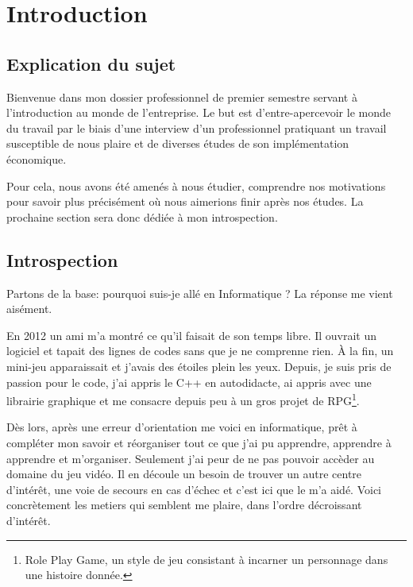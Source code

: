 \documentclass[12pt, a4paper]{report} %
\begin{document}
\maketitle


\chapter{Introduction}

\section*{Explication du sujet}
Bienvenue dans mon dossier professionnel de premier semestre servant à l'introduction au monde de l'entreprise. Le but est d'entre-apercevoir le monde du travail par le biais d'une interview d'un professionnel pratiquant un travail susceptible de nous plaire et de diverses études de son implémentation économique.

Pour cela, nous avons été amenés à nous étudier, comprendre nos motivations pour savoir plus précisément où nous aimerions finir après nos études. La prochaine section sera donc dédiée à mon introspection.

\section{Introspection}
Partons de la base: pourquoi suis-je allé en Informatique ? La réponse me vient aisément.

En 2012 un ami m'a montré ce qu'il faisait de son temps libre. Il ouvrait un logiciel et tapait des lignes de codes sans que je ne comprenne rien. \`A la fin, un mini-jeu apparaissait et j'avais des étoiles plein les yeux. Depuis, je suis pris de passion pour le code, j'ai appris le C++ en autodidacte, ai appris avec une librairie graphique et me consacre depuis peu à un gros projet de RPG\footnote{Role Play Game, un style de jeu consistant à incarner un personnage dans une histoire donnée.}.

Dès lors, après une erreur d'orientation me voici en informatique, prêt à compléter mon savoir et réorganiser tout ce que j'ai pu apprendre, apprendre à apprendre et m'organiser. Seulement j'ai peur de ne pas pouvoir accèder au domaine du jeu vidéo. Il en découle un besoin de trouver un autre centre d'intérêt, une voie de secours en cas d'échec et c'est ici que le  m'a aidé. Voici concrètement les metiers qui semblent me plaire, dans l'ordre décroissant d'intérêt.
\end{document}

